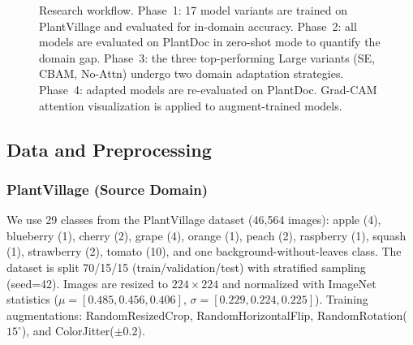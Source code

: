 \documentclass[preprint,12pt]{elsarticle}
\begin{document}
\begin{figure}[t]
\caption{Research workflow. Phase~1: 17 model variants are trained on PlantVillage and evaluated for in-domain accuracy. Phase~2: all models are evaluated on PlantDoc in zero-shot mode to quantify the domain gap. Phase~3: the three top-performing Large variants (SE, CBAM, No-Attn) undergo two domain adaptation strategies. Phase~4: adapted models are re-evaluated on PlantDoc. Grad-CAM attention visualization is applied to augment-trained models.}\label{fig:workflow}
\end{figure}

\subsection{Data and Preprocessing}

\subsubsection{PlantVillage (Source Domain)}

We use 29 classes from the PlantVillage dataset \cite{Mohanty2016} (46,564 images): apple (4), blueberry (1), cherry (2), grape (4), orange (1), peach (2), raspberry (1), squash (1), strawberry (2), tomato (10), and one background-without-leaves class. The dataset is split 70/15/15 (train/validation/test) with stratified sampling (seed=42). Images are resized to $224\times224$ and normalized with ImageNet statistics ($\mu=[0.485,0.456,0.406]$, $\sigma=[0.229,0.224,0.225]$). Training augmentations: RandomResizedCrop, RandomHorizontalFlip, RandomRotation($15^\circ$), and ColorJitter($\pm0.2$).
\end{document}
